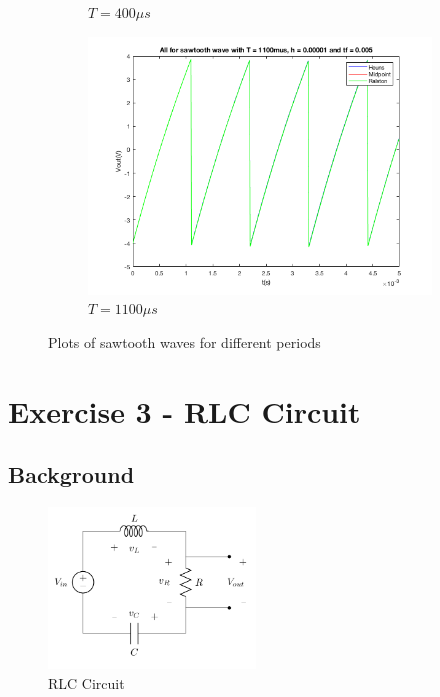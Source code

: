 \documentclass[11pt,a4paper]{article}
\begin{document}
\begin{figure}[h]
\begin{subfigure}{.5\textwidth}
          \caption{$T = 400\mu s$}
          \label{fig:sfig11}
        \end{subfigure}
        \begin{subfigure}{.5\textwidth}
          \centering
          \includegraphics[width=.8\linewidth]{Ex1_Figs/sawtooth1100.png}
          \caption{$T = 1100\mu s$}
          \label{fig:sfig12}
        \end{subfigure}
        \caption{Plots of sawtooth waves for different periods}
        \label{fig:test6}
    \end{figure}

\pagebreak
\section{Exercise 3 - RLC Circuit}\vspace{-1mm}
\subsection{Background}

\begin{figure}
\vspace{-10mm}
  		\includegraphics[width=0.49\textwidth]{Ex3_Figs/RLC.png}
\vspace{-6mm}
  	\caption{RLC Circuit}
  	\label{fig:RLC}
\end{figure}
\end{document}
